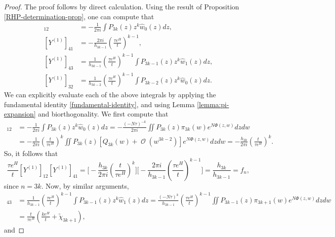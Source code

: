 \documentclass[usenames,dvipsnames]{article}
\theoremstyle{definition}
\DeclareMathOperator{\OO}{\mathcal{O}}
\numberwithin{equation}{section}
\numberwithin{figure}{section}
\begin{document}
\begin{proof}
    The proof follows by direct calculation. Using the result of Proposition \ref{RHP-determination-prop}, one can compute that
        \begin{align*}
            [Y^{(1)}]_{12} &= -\frac{1}{2\pi i}\int P_{3k}(z) z^{k} \hat{w}_0(z)dz,\\
            [Y^{(1)}]_{41} &= -\frac{2\pi i}{h_{3k-1}} \left(\frac{\tau e^H}{t}\right)^{k-1},\\
            [Y^{(1)}]_{43} &= \frac{1}{h_{3k-1}} \left(\frac{\tau e^H}{t}\right)^{k-1}\int P_{3k-1}(z)z^{k} \hat{w}_1(z)dz,\\
            [Y^{(1)}]_{32} &=  \frac{1}{h_{3k-2}} \left(\frac{\tau e^H}{t}\right)^{k-1}\int P_{3k-2}(z)z^{k} \hat{w}_0(z)dz.
        \end{align*}
    We can explicitly evaluate each of the above integrals by applying the fundamental identity \eqref{fundamental-identity}, and using Lemma
    \ref{lemma:pi-expansion} and biorthogonality. We first compute that
        \begin{align*}
            [Y^{(1)}]_{12} &= -\frac{1}{2\pi i}\int P_{3k}(z) z^{k} \hat{w}_0(z)dz
                           = -\frac{(-N\tau)^{-k}}{2\pi i}\iint P_{3k}(z)\pi_{3k}(w) e^{N\Phi(z,w)}dzdw\\
                           &=-\frac{1}{2\pi i}\left(\frac{t}{\tau e^H}\right)^k \iint P_{3k}(z)[Q_{3k}(w) + \OO(w^{3k-2})]e^{N\Phi(z,w)}dzdw
                           =-\frac{h_{3k}}{2\pi i}\left(\frac{t}{\tau e^H}\right)^k.
        \end{align*}
    So, it follows that
        \begin{equation*}
           \frac{\tau e^{H}}{t} [Y^{(1)}]_{12}[Y^{(1)}]_{41} = \bigg[-\frac{h_{3k}}{2\pi i}\left(\frac{t}{\tau e^H}\right)^k\bigg]\bigg[-\frac{2\pi i}{h_{3k-1}} \left(\frac{\tau e^H}{t}\right)^{k-1}\bigg] = \frac{h_{3k}}{h_{3k-1}} = f_{n},
        \end{equation*}
    since $n = 3k$. Now, by similar arguments,
        \begin{align*}
            [Y^{(1)}]_{43} &= \frac{1}{h_{3k-1}} \left(\frac{\tau e^H}{t}\right)^{k-1}\int P_{3k-1}(z)z^{k} \hat{w}_1(z)dz
            =\frac{(-N\tau)^{k}}{h_{3k-1}} \left(\frac{\tau e^H}{t}\right)^{k-1}\iint P_{3k-1}(z) \pi_{3k+1}(w) e^{N\Phi(z,w)}dzdw\\
            &= \frac{t}{\tau e^{H}}\left(\frac{k e^H}{t}+\tilde{\chi}_{3k+1}\right),
        \end{align*}
    and

\end{proof}
\end{document}
